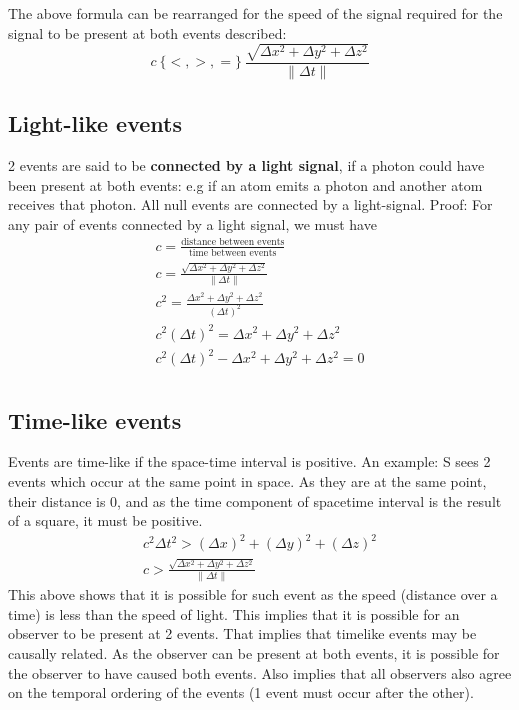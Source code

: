 \documentclass[10pt]{report}
\begin{document}
{{The above formula can be rearranged for the speed of the signal required for the signal to be present at both events described:
\[
c\ \{<, >, =\}\ \frac{\sqrt{\Delta x^2 + \Delta y^{2}+\Delta z^{2}}}{\|\Delta t\|}
\] 

}
\subsection{Light-like events}
\par{2 events are said to be \textbf{connected by a light signal}, if a photon could have been present at both events: e.g if an atom emits a photon and another atom receives that photon. All null events are connected by a light-signal. Proof: For any pair of events connected by a light signal, we must have
	\begin{align*}
		c=\frac{\text{distance between events}}{\text{time between events}} \\
		c=\frac{\sqrt{\Delta x^{2}+\Delta y^{2}+\Delta z^{2}}}{\|\Delta t\|} \\
		c^{2}=\frac{\Delta x^{2}+\Delta y^{2}+\Delta z^{2}}{\left(\Delta t\right)^{2}} \\
		c^{2}\left(\Delta t\right)^{2}=\Delta x^{2}+\Delta y^{2}+\Delta z^{2} \\
		c^{2}\left(\Delta t\right)^{2}-\Delta x^{2}+\Delta y^{2}+\Delta z^{2}=0 \\
	\end{align*}
}
\subsection{Time-like events}
\par{Events are time-like if the space-time interval is positive. An example: S sees 2 events which occur at the same point in space. As they are at the same point, their distance is 0, and as the time component of spacetime interval is the result of a square, it must be positive.
\begin{align*}
	c^{2}\Delta t^{2}>\left(\Delta x\right)^{2}+\left(\Delta y\right)^{2}+\left(\Delta z\right)^{2} \\
	c>\frac{\sqrt{\Delta x^{2}+\Delta y^{2}+ \Delta z^{2}}}{\|\Delta t\|}
\end{align*}
This above shows that it is possible for such event as the speed (distance over a time) is less than the speed of light. This implies that it is possible for an observer to be present at 2 events. That implies that timelike events may be causally related. As the observer can be present at both events, it is possible for the observer to have caused both events. Also implies that all observers also agree on the temporal ordering of the events (1 event must occur after the other). }
}
\end{document}
